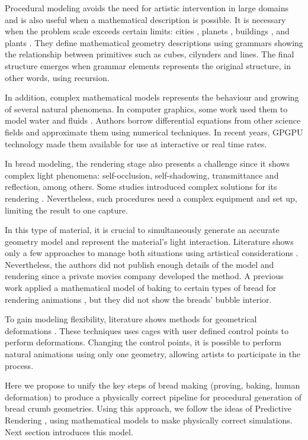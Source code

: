 \documentclass[final,5p,times]{elsarticle}
\begin{document}
Procedural modeling avoids the need for artistic intervention in large domains and is also useful when a mathematical description is possible. It is necessary when the problem scale exceeds certain limits: cities \cite{Parish2001}, planets \cite{Ebert2002}, buildings \cite{Muller2006}, and plants \cite{Prusinkiewicz1990}. They define mathematical geometry descriptions using grammars showing the relationship between primitives such as cubes, cilynders and lines. The final structure emerges when grammar elements represents the original structure, in other words, using recursion.

In addition, complex mathematical models represents the behaviour and growing of several natural phenomena. In computer graphics, some work used them to model water and fluids \cite{Stam1999,Fedkiw2001}. Authors borrow differential equations from other science fields and approximate them using numerical techniques. In recent years, GPGPU technology \cite{Owens2007} made them available for use at interactive or real time rates.

In bread modeling, the rendering stage also presents a challenge since it shows complex light phenomena: self-occlusion, self-shadowing, transmittance and reflection, among others. Some studies introduced complex solutions for its rendering \cite{Tong2005}. Nevertheless, such procedures need a complex equipment and set up, limiting the result to one capture. 

In this type of material, it is crucial to simultaneously generate an accurate geometry model and represent the material's light interaction. Literature shows only a few approaches to manage both situations using artistical considerations \cite{Cho2007}. Nevertheless, the authors did not publish enough details of the model and rendering since a private movies company developed the method. A previous work applied a mathematical model of baking to certain types of bread for rendering animations \cite{Rodriguez-Arenas2011}, but they did not show the breads' bubble interior.

To gain modeling flexibility, literature shows methods for geometrical deformations \cite{Lipman2008,Floater2003}. These techniques uses cages with user defined control points to perform deformations. Changing the control points, it is possible to perform natural animations using only one geometry, allowing artists to participate in the process.

Here we propose to unify the key steps of bread making (proving, baking, human deformation) to produce a physically correct pipeline for procedural generation of bread crumb geometries. Using this approach, we follow the ideas of Predictive Rendering \cite{Wilkie2009}, using mathematical models to make physically correct simulations. Next section introduces this model.
\end{document}
